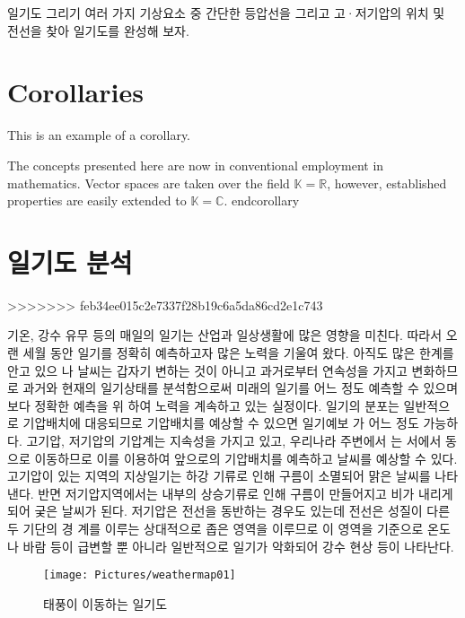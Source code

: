 일기도 그리기
여러 가지 기상요소 중 간단한 등압선을 그리고 고·저기압의 위치 및 전선을 찾아 일기도를 완성해 보자.




\section{Corollaries}

This is an example of a corollary.

\begin{corollary}
	The concepts presented here are now in conventional employment in mathematics. Vector spaces are taken over the field $\mathbb{K}=\mathbb{R}$, however, established properties are easily extended to $\mathbb{K}=\mathbb{C}$.
	end{corollary}
	
	
	\section{일기도 분석}
>>>>>>> feb34ee015c2e7337f28b19c6a5da86cd2e1c743
	
	기온, 강수 유무 등의 매일의 일기는 산업과 일상생활에 많은 영향을 미친다. 따라서 오랜
	세월 동안 일기를 정확히 예측하고자 많은 노력을 기울여 왔다. 아직도 많은 한계를 안고 있으
	나 날씨는 갑자기 변하는 것이 아니고 과거로부터 연속성을 가지고 변화하므로 과거와 현재의
	일기상태를 분석함으로써 미래의 일기를 어느 정도 예측할 수 있으며 보다 정확한 예측을 위
	하여 노력을 계속하고 있는 실정이다.
	일기의 분포는 일반적으로 기압배치에 대응되므로 기압배치를 예상할 수 있으면 일기예보
	가 어느 정도 가능하다. 고기압, 저기압의 기압계는 지속성을 가지고 있고, 우리나라 주변에서
	는 서에서 동으로 이동하므로 이를 이용하여 앞으로의 기압배치를 예측하고 날씨를 예상할 수
	있다. 고기압이 있는 지역의 지상일기는 하강 기류로 인해 구름이 소멸되어 맑은 날씨를 나타
	낸다. 반면 저기압지역에서는 내부의 상승기류로 인해 구름이 만들어지고 비가 내리게 되어
	궂은 날씨가 된다. 저기압은 전선을 동반하는 경우도 있는데 전선은 성질이 다른 두 기단의 경
	계를 이루는 상대적으로 좁은 영역을 이루므로 이 영역을 기준으로 온도나 바람 등이 급변할
	뿐 아니라 일반적으로 일기가 악화되어 강수 현상 등이 나타난다.
	
	\begin{figure}
		\centering
		\texttt{[image: Pictures/weathermap01]}
		\caption{태풍이 이동하는 일기도}
		\label{fig:weathermap01}
	\end{figure}
	

\end{corollary}
